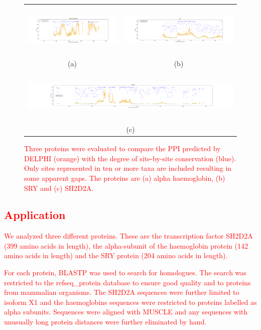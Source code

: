 \documentclass{bioinfo}
\newcommand{\mySecondColor}{red}
\begin{document}
\begin{figure}
\centering
\begin{tabular}{cc}
\includegraphics[height=2.55cm]{hemoglobin_top178_conservation.pdf} & 
\includegraphics[height=2.55cm]{SRY_conservation.pdf}\\
\small (a) & \small (b)\\
\multicolumn{2}{c}{\includegraphics[height=2.55cm]{SH2_conservation.pdf}}\\
\multicolumn{2}{c}{\small (c)}
\end{tabular}
  \caption{\textcolor{\mySecondColor}{Three proteins were evaluated to compare the PPI
predicted by DELPHI (orange) with the degree of site-by-site conservation
(blue).  Only sites represented in ten or more taxa are included resulting
in some apparent gaps.  The proteins are (a) alpha haemoglobin, (b) SRY
and (c) SH2D2A.} 
  \label{fig_conservation_vs_sitePred}}
\end{figure}


\subsection{\textcolor{\mySecondColor}{Application}}

\textcolor{\mySecondColor}{We analyzed three different proteins.  These are the transcription factor SH2D2A (399 amino acids in length), the alpha-subunit of the haemoglobin protein (142 amino acids in length) and the SRY protein (204 amino acids
in length).}

\textcolor{\mySecondColor}{For each protein, BLASTP was used to search for homologues.  The search was restricted to the refseq\_protein database to ensure good quality and
to proteins from mammalian organisms.  The SH2D2A sequences were further
limited to isoform X1 and the haemoglobins sequences were restricted to
proteins labelled as alpha subunits.  Sequences were aligned with MUSCLE
\citep{edgar2004muscle} and any sequences with unusually long protein distances
were further eliminated by hand.}
\end{document}
